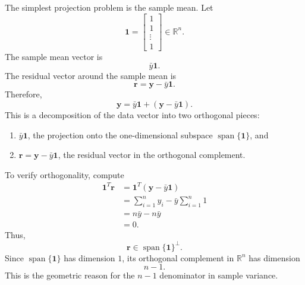 The simplest projection problem is the sample mean.  Let
\begin{equation}
  \mathbf{1}=\begin{bmatrix}1\\1\\\vdots\\1\end{bmatrix}\in\mathbb{R}^n.
\end{equation}
The sample mean vector is
\begin{equation}
  \bar{y}\mathbf{1}.
\end{equation}
The residual vector around the sample mean is
\begin{equation}
  \mathbf{r}=\mathbf{y}-\bar{y}\mathbf{1}.
\end{equation}
Therefore,
\begin{equation}
  \boxed{\mathbf{y}=\bar{y}\mathbf{1}+\left(\mathbf{y}-\bar{y}\mathbf{1}\right).}
  \label{eq:ch8-mean-decomposition}
\end{equation}
This is a decomposition of the data vector into two orthogonal pieces:
\begin{enumerate}
  \item \(\bar{y}\mathbf{1}\), the projection onto the one-dimensional subspace \(\operatorname{span}\{\mathbf{1}\}\), and
  \item \(\mathbf{r}=\mathbf{y}-\bar{y}\mathbf{1}\), the residual vector in the orthogonal complement.
\end{enumerate}

To verify orthogonality, compute
\begin{align}
  \mathbf{1}^T\mathbf{r}
  &=\mathbf{1}^T(\mathbf{y}-\bar{y}\mathbf{1}) \\
  &=\sum_{i=1}^n y_i-\bar{y}\sum_{i=1}^n 1 \\
  &=n\bar{y}-n\bar{y} \\
  &=0.
\end{align}
Thus,
\begin{equation}
  \mathbf{r}\in \operatorname{span}\{\mathbf{1}\}^{\perp}.
\end{equation}
Since \(\operatorname{span}\{\mathbf{1}\}\) has dimension \(1\), its orthogonal complement in \(\mathbb{R}^n\) has dimension
\begin{equation}
  n-1.
\end{equation}
This is the geometric reason for the \(n-1\) denominator in sample variance.

